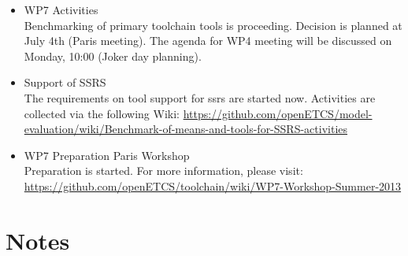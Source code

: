 \documentclass[a4paper, 11pt]{article}
\begin{document}
\begin{itemize}
\item WP7 Activities\\
Benchmarking of primary toolchain tools is proceeding. Decision is planned at July 4th (Paris meeting). The agenda for WP4 meeting will be discussed on Monday, 10:00 (Joker day planning).

\item Support of SSRS\\
The requirements on tool support for ssrs are started now. Activities are collected via the following Wiki:
\url{https://github.com/openETCS/model-evaluation/wiki/Benchmark-of-means-and-tools-for-SSRS-activities}
\item WP7 Preparation Paris Workshop\\
Preparation is started. For more information, please
visit:\\
\url{https://github.com/openETCS/toolchain/wiki/WP7-Workshop-Summer-2013}

\end{itemize}

\section{Notes}
\end{document}
